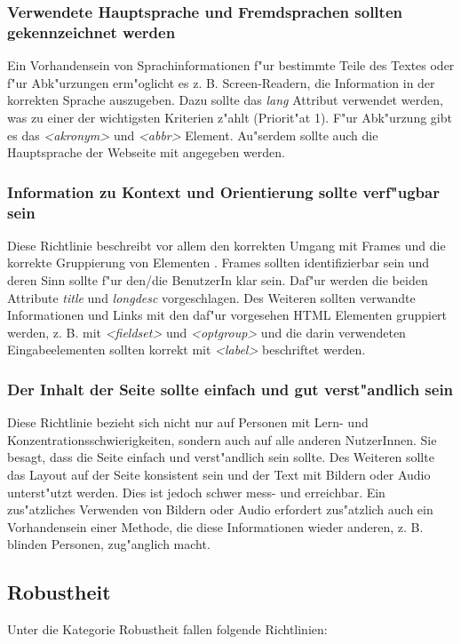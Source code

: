 \documentclass[a4paper,bibtotoc,oneside]{scrbook}
\begin{document}
\subsubsection{Verwendete Hauptsprache und Fremdsprachen sollten gekennzeichnet werden}
Ein Vorhandensein von Sprachinformationen f"ur bestimmte Teile des Textes oder f"ur Abk"urzungen erm"oglicht es z. B. Screen-Readern, die Information in der korrekten Sprache auszugeben. Dazu sollte das \emph{lang} Attribut verwendet werden, was zu einer der wichtigsten Kriterien z"ahlt (Priorit"at 1). F"ur Abk"urzung gibt es das \emph{<akronym>} und \emph{<abbr>} Element.
Au"serdem sollte auch die Hauptsprache der Webseite mit angegeben werden.\cite[Abschnitt 6.4]{wcag1}

\subsubsection{Information zu Kontext und Orientierung sollte verf"ugbar sein}
Diese Richtlinie beschreibt vor allem den korrekten Umgang mit Frames und die korrekte Gruppierung von Elementen \cite[S. 50]{barr_webd}. Frames sollten identifizierbar sein und deren Sinn sollte f"ur den/die BenutzerIn klar sein. Daf"ur werden die beiden Attribute \emph{title} und \emph{longdesc} vorgeschlagen. Des Weiteren sollten verwandte Informationen und Links mit den daf"ur vorgesehen HTML Elementen gruppiert werden, z. B. mit \emph{<fieldset>} und \emph{<optgroup>} und die darin verwendeten Eingabeelementen sollten korrekt mit \emph{<label>} beschriftet werden. 
\cite[Abschnitt 6.12]{wcag1}

\subsubsection{Der Inhalt der Seite sollte einfach und gut verst"andlich sein}
Diese Richtlinie bezieht sich nicht nur auf Personen mit Lern- und Konzentrationsschwierigkeiten, sondern auch auf alle anderen NutzerInnen. Sie besagt, dass die Seite einfach und verst"andlich sein sollte. Des Weiteren sollte das Layout auf der Seite konsistent sein und der Text mit Bildern oder Audio unterst"utzt werden. \cite[Abschnitt 6.14]{wcag1}
Dies ist jedoch schwer mess- und erreichbar. Ein zus"atzliches Verwenden von Bildern oder Audio erfordert zus"atzlich auch ein Vorhandensein einer Methode, die diese Informationen wieder anderen, z. B. blinden Personen, zug"anglich macht. \cite[S. 52]{barr_webd}

\subsection{Robustheit}
Unter die Kategorie Robustheit fallen folgende Richtlinien: 
\end{document}
